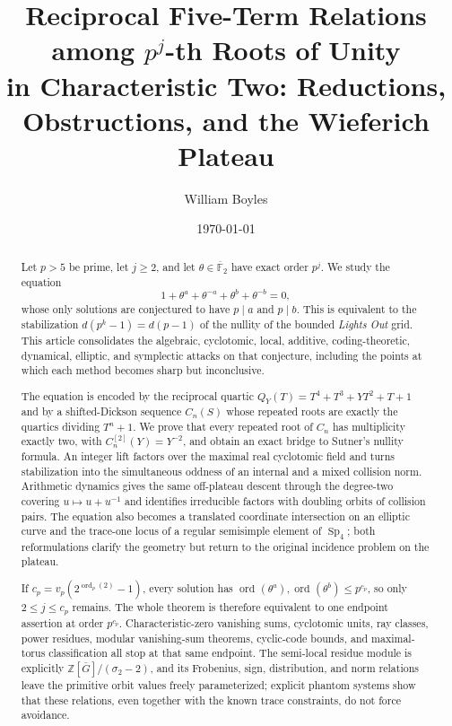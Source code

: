 \documentclass[a4paper]{article}
\newcommand{\F}{\mathbb{F}}
\newcommand{\Z}{\mathbb{Z}}
\newcommand{\ord}[2][]{\operatorname{ord}_{#1}\!\left(#2\right)}
\newcommand{\Sp}{\operatorname{Sp}}
\begin{document}
\title{Reciprocal Five-Term Relations among $p^j$-th Roots of Unity\\
in Characteristic Two: Reductions, Obstructions, and the Wieferich Plateau}
\author{William Boyles}
\date{\today}
\maketitle

\begin{abstract}
	Let $p>5$ be prime, let $j\geq2$, and let $\theta\in\overline{\F}_2$ have
	exact order $p^j$.
	We study the equation
	\[
		1+\theta^{a}+\theta^{-a}+\theta^{b}+\theta^{-b}=0,
	\]
	whose only solutions are conjectured to have $p\mid a$ and $p\mid b$.
	This is equivalent to the stabilization
	$d(p^k-1)=d(p-1)$ of the nullity of the bounded
	\textit{Lights Out} grid.  This article consolidates the algebraic,
	cyclotomic, local, additive, coding-theoretic, dynamical, elliptic, and
	symplectic attacks on that conjecture, including the points at which
	each method becomes sharp but inconclusive.

	The equation is encoded by the reciprocal quartic
	$Q_Y(T)=T^4+T^3+YT^2+T+1$ and by a shifted-Dickson sequence
	$C_n(S)$ whose repeated roots are exactly the quartics dividing
	$T^n+1$.  We prove that every repeated root of $C_n$ has multiplicity
	exactly two, with $C_n^{[2]}(Y)=Y^{-2}$, and obtain an exact bridge to
	Sutner's nullity formula.  An integer lift factors over the maximal real
	cyclotomic field and turns stabilization into the simultaneous oddness
	of an internal and a mixed collision norm.  Arithmetic dynamics gives
	the same off-plateau descent through the degree-two covering
	$u\mapsto u+u^{-1}$ and identifies irreducible factors with doubling
	orbits of collision pairs.  The equation also becomes a translated
	coordinate intersection on an elliptic curve and the trace-one locus of
	a regular semisimple element of $\Sp_4$; both reformulations clarify the
	geometry but return to the original incidence problem on the plateau.

	If
	$c_p=v_p(2^{\ord[p]{2}}-1)$, every solution has
	$\ord{\theta^a},\ord{\theta^b}\leq p^{c_p}$, so only
	$2\leq j\leq c_p$ remains.  The whole theorem is therefore equivalent
	to one endpoint assertion at order $p^{c_p}$.  Characteristic-zero
	vanishing sums, cyclotomic units, ray classes, power residues, modular
	vanishing-sum theorems, cyclic-code bounds, and maximal-torus
	classification all stop at that same endpoint.  The semi-local residue
	module is explicitly
	$\Z[\bar G]/(\sigma_2-2)$, and its Frobenius, sign, distribution, and
	norm relations leave the primitive orbit values freely parameterized;
	explicit phantom systems show that these relations, even together with
	the known trace constraints, do not force avoidance.


\end{abstract}
\end{document}
